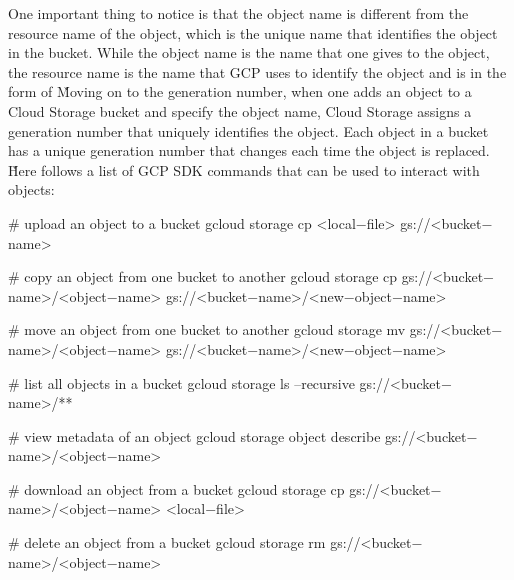 One important thing to notice is that the object name is different from the resource name of the object, which is the
unique name that identifies the object in the bucket. While the object name is the name that one gives to the object,
the resource name is the name that GCP uses to identify the object and is in the form of
 \v

Moving on to the generation number, when one adds an object to a Cloud Storage bucket and specify the object name, Cloud
Storage assigns a generation number that uniquely identifies the object. Each object in a bucket has a unique generation
number that changes each time the object is replaced. \v

Here follows a list of GCP SDK commands that can be used to interact with objects:
\begin{bash}
# upload an object to a bucket
gcloud storage cp <local$-$file> gs://<bucket$-$name>
\end{bash}

\begin{bash}
# copy an object from one bucket to another
gcloud storage cp gs://<bucket$-$name>/<object$-$name> gs://<bucket$-$name>/<new$-$object$-$name>
\end{bash}

\begin{bash}
# move an object from one bucket to another
gcloud storage mv gs://<bucket$-$name>/<object$-$name> gs://<bucket$-$name>/<new$-$object$-$name>
\end{bash}

\begin{bash}
# list all objects in a bucket
gcloud storage ls --recursive gs://<bucket$-$name>/**
\end{bash}

\begin{bash}
# view metadata of an object
gcloud storage object describe gs://<bucket$-$name>/<object$-$name>
\end{bash}

\begin{bash}
# download an object from a bucket
gcloud storage cp gs://<bucket$-$name>/<object$-$name> <local$-$file>
\end{bash}

\begin{bash}
# delete an object from a bucket
gcloud storage rm gs://<bucket$-$name>/<object$-$name>
\end{bash}

